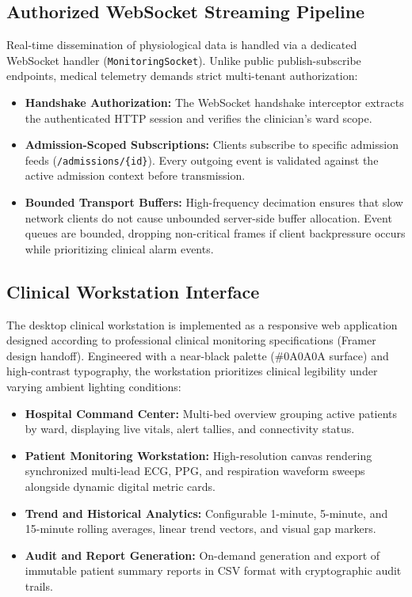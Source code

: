 \documentclass[10pt,journal,compsoc]{IEEEtran}
\begin{document}
\subsection{Authorized WebSocket Streaming Pipeline}
Real-time dissemination of physiological data is handled via a dedicated WebSocket handler (\texttt{MonitoringSocket}). Unlike public publish-subscribe endpoints, medical telemetry demands strict multi-tenant authorization:
\begin{itemize}
    \item \textbf{Handshake Authorization:} The WebSocket handshake interceptor extracts the authenticated HTTP session and verifies the clinician's ward scope.
    \item \textbf{Admission-Scoped Subscriptions:} Clients subscribe to specific admission feeds (\texttt{/admissions/\{id\}}). Every outgoing event is validated against the active admission context before transmission.
    \item \textbf{Bounded Transport Buffers:} High-frequency decimation ensures that slow network clients do not cause unbounded server-side buffer allocation. Event queues are bounded, dropping non-critical frames if client backpressure occurs while prioritizing clinical alarm events.
\end{itemize}

\subsection{Clinical Workstation Interface}
The desktop clinical workstation is implemented as a responsive web application designed according to professional clinical monitoring specifications (Framer design handoff). Engineered with a near-black palette (\#0A0A0A surface) and high-contrast typography, the workstation prioritizes clinical legibility under varying ambient lighting conditions:
\begin{itemize}
    \item \textbf{Hospital Command Center:} Multi-bed overview grouping active patients by ward, displaying live vitals, alert tallies, and connectivity status.
    \item \textbf{Patient Monitoring Workstation:} High-resolution canvas rendering synchronized multi-lead ECG, PPG, and respiration waveform sweeps alongside dynamic digital metric cards.
    \item \textbf{Trend and Historical Analytics:} Configurable 1-minute, 5-minute, and 15-minute rolling averages, linear trend vectors, and visual gap markers.
    \item \textbf{Audit and Report Generation:} On-demand generation and export of immutable patient summary reports in CSV format with cryptographic audit trails.
\end{itemize}
\end{document}
